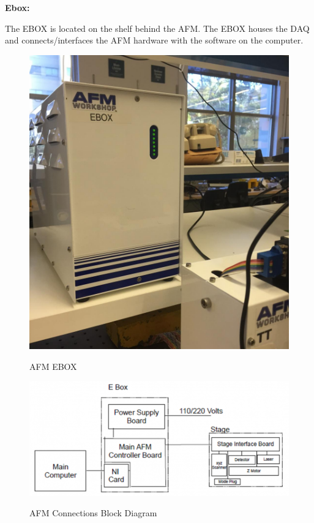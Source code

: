 \documentclass{../lab}
\begin{document}
\textbf{Ebox:}

The EBOX is located on the shelf behind the AFM. The EBOX houses the DAQ and connects/interfaces the AFM hardware with the software on the computer.

\begin{figure}[H]
\centering
  \href{http://experimentationlab.berkeley.edu/sites/default/files/EBOX.jpg}{\includegraphics[height=150\px,keepaspectratio]{images/EBOX.jpg}}
  \caption{AFM EBOX}
  \label{fig:EBox}
\endminipage\hfill
{}
\centering
  \href{http://experimentationlab.berkeley.edu/sites/default/files/AFMImages/AFMconnections.PNG}{\includegraphics[height=150\px,keepaspectratio]{images/AFMconnections.PNG}}
  \caption{AFM Connections Block Diagram}
    \label{fig:AFMConnections}
\endminipage
\end{figure}
\end{document}
